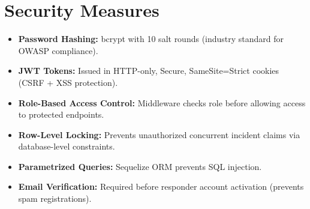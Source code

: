 \section{Security Measures}

\begin{itemize}
  \item \textbf{Password Hashing:} bcrypt with 10 salt rounds (industry standard for OWASP compliance).
  \item \textbf{JWT Tokens:} Issued in HTTP-only, Secure, SameSite=Strict cookies (CSRF + XSS protection).
  \item \textbf{Role-Based Access Control:} Middleware checks role before allowing access to protected endpoints.
  \item \textbf{Row-Level Locking:} Prevents unauthorized concurrent incident claims via database-level constraints.
  \item \textbf{Parametrized Queries:} Sequelize ORM prevents SQL injection.
  \item \textbf{Email Verification:} Required before responder account activation (prevents spam registrations).
\end{itemize}

